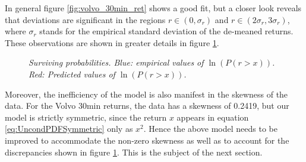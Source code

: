 In general figure \ref{fig:volvo_30min_ret} shows a good fit, but a
closer look reveals that deviations are significant in the regions $r
\in (0, \sigma_r)$ and $r \in (2\sigma_r, 3\sigma_r)$, where
$\sigma_r$ stands for the empirical standard deviation of the
de-meaned returns. These observations are
shown in greater details in figure \ref{fig:volvo_30min_ret2}.
\begin{figure}[htb!]
  \centering
  \caption{\small \it Surviving probabilities. Blue: empirical values of $\ln(P(r
    > x))$. Red: Predicted values of $\ln(P(r > x))$.}
  \label{fig:volvo_30min_ret2}
\end{figure}

Moreover, the inefficiency of the model is also manifest in the
skewness of the data. For the Volvo 30min returns, the data has a
skewness of 0.2419, but our model is strictly symmetric, since the
return $x$ appears in equation \ref{eq:UncondPDFSymmetric} only as $x^2$.
Hence the above model needs to be improved to accommodate the non-zero
skewness as well as to account for the discrepancies shown in figure
\ref{fig:volvo_30min_ret2}. This is the subject of the next section.

